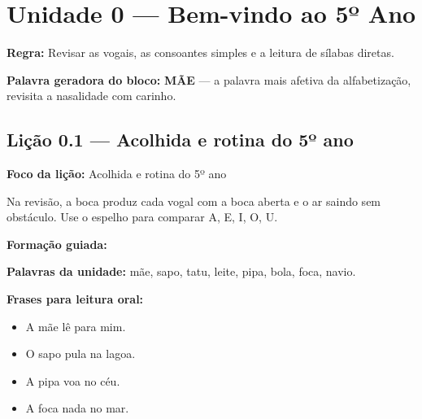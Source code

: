 

\chapter{Unidade 0 --- Bem-vindo ao 5º Ano}


\textbf{Regra:} Revisar as vogais, as consoantes simples e a leitura de sílabas diretas.

\textbf{Palavra geradora do bloco:} \textbf{MÃE} --- a palavra mais afetiva da alfabetização, revisita a nasalidade com carinho.

\section{Lição 0.1 --- Acolhida e rotina do 5º ano}

\textbf{Foco da lição:} Acolhida e rotina do 5º ano


\begin{boquinha}
Na revisão, a boca produz cada vogal com a boca aberta e o ar saindo sem obstáculo. Use o espelho para comparar A, E, I, O, U.
\end{boquinha}

\noindent\textbf{Formação guiada:}

\begin{center}
\end{center}

\noindent\textbf{Palavras da unidade:} mãe, sapo, tatu, leite, pipa, bola, foca, navio.

\noindent\textbf{Frases para leitura oral:}
\begin{itemize}[leftmargin=1.6em]
  \item A mãe lê para mim.
  \item O sapo pula na lagoa.
  \item A pipa voa no céu.
  \item A foca nada no mar.
\end{itemize}

